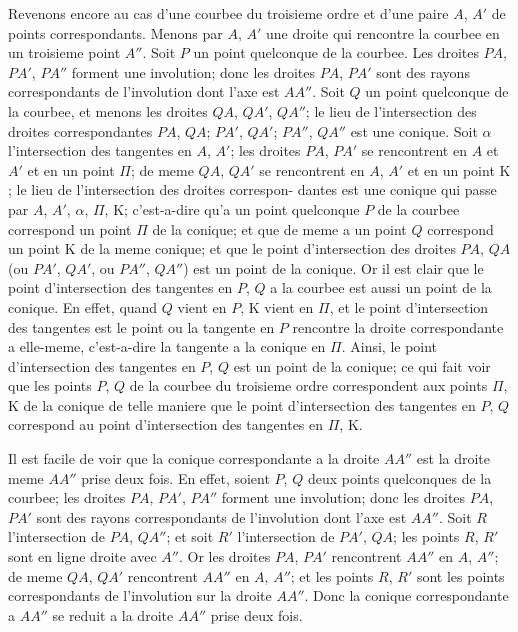 \documentclass[11pt,a4paper]{book}
\begin{document}
Revenons encore au cas d'une courbee du troisieme ordre et d'une paire $A$, $A'$
de points correspondants. Menons par $A$, $A'$ une droite qui rencontre la courbee en un
troisieme point $A''$. Soit $P$ un point quelconque de la courbee. Les droites $PA$, $PA'$, $PA''$
forment une involution; donc les droites $PA$, $PA'$ sont des rayons correspondants de
l'involution dont l'axe est $AA''$. Soit $Q$ un point quelconque de la courbee, et menons
les droites $QA$, $QA'$, $QA''$; le lieu de l'intersection des droites correspondantes $PA$, $QA$;
$PA'$, $QA'$; $PA''$, $QA''$ est une conique. Soit $\alpha$ l'intersection des tangentes en $A$, $A'$; les
droites $PA$, $PA'$ se rencontrent en $A$ et $A'$ et en un point $\Pi$; de meme $QA$, $QA'$ se
rencontrent en $A$, $A'$ et en un point $\mathrm{K}$; le lieu de l'intersection des droites correspon-
dantes est une conique qui passe par $A$, $A'$, $\alpha$, $\Pi$, $\mathrm{K}$; c'est-a-dire qu'a un point quelconque
$P$ de la courbee correspond un point $\Pi$ de la conique; et que de meme a un point $Q$
correspond un point $\mathrm{K}$ de la meme conique; et que le point d'intersection des droites
$PA$, $QA$ (ou $PA'$, $QA'$, ou $PA''$, $QA''$) est un point de la conique. Or il est clair que le
point d'intersection des tangentes en $P$, $Q$ a la courbee est aussi un point de la conique.
En effet, quand $Q$ vient en $P$, $\mathrm{K}$ vient en $\Pi$, et le point d'intersection des tangentes
est le point ou la tangente en $P$ rencontre la droite correspondante a elle-meme, c'est-a-dire
la tangente a la conique en $\Pi$. Ainsi, le point d'intersection des tangentes en $P$, $Q$ est
un point de la conique; ce qui fait voir que les points $P$, $Q$ de la courbee du troisieme
ordre correspondent aux points $\Pi$, $\mathrm{K}$ de la conique de telle maniere que le point
d'intersection des tangentes en $P$, $Q$ correspond au point d'intersection des tangentes
en $\Pi$, $\mathrm{K}$.

Il est facile de voir que la conique correspondante a la droite $AA''$ est la droite
meme $AA''$ prise deux fois. En effet, soient $P$, $Q$ deux points quelconques de la
courbee; les droites $PA$, $PA'$, $PA''$ forment une involution; donc les droites $PA$, $PA'$
sont des rayons correspondants de l'involution dont l'axe est $AA''$. Soit $R$ l'intersection
de $PA$, $QA''$; et soit $R'$ l'intersection de $PA'$, $QA$; les points $R$, $R'$ sont en ligne droite
avec $A''$. Or les droites $PA$, $PA'$ rencontrent $AA''$ en $A$, $A''$; de meme $QA$, $QA'$
rencontrent $AA''$ en $A$, $A''$; et les points $R$, $R'$ sont les points correspondants de
l'involution sur la droite $AA''$. Donc la conique correspondante a $AA''$ se reduit a la
droite $AA''$ prise deux fois.
\end{document}
